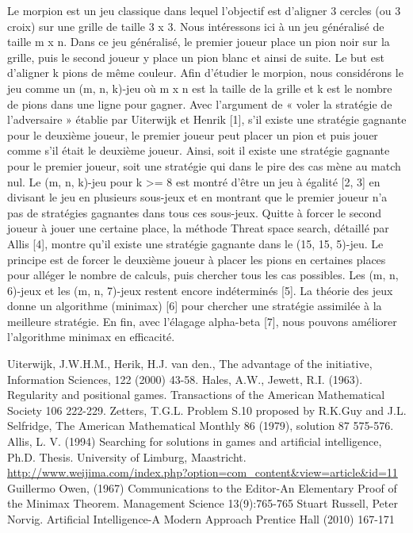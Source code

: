 Le morpion est un jeu classique dans lequel l'objectif est d'aligner 3 cercles (ou 3 croix) sur une grille de taille 3 x 3. Nous intéressons ici à un jeu généralisé de taille m x n. Dans ce jeu généralisé, le premier joueur place un pion noir sur la grille, puis le second joueur y place un pion blanc et ainsi de suite. Le but est d'aligner k pions de même couleur.
Afin d'étudier le morpion, nous considérons le jeu comme un (m, n, k)-jeu où m x n est la taille de la grille et k est le nombre de pions dans une ligne pour gagner. Avec l'argument de « voler la stratégie de l'adversaire » établie par Uiterwijk et Henrik [1], s'il existe une stratégie gagnante pour le deuxième joueur, le premier joueur peut placer un pion et puis jouer comme s'il était le deuxième joueur. Ainsi, soit il existe une stratégie gagnante pour le premier joueur, soit une stratégie qui dans le pire des cas mène au match nul. Le (m, n, k)-jeu pour k >= 8 est montré d'être un jeu à égalité [2, 3] en divisant le jeu en plusieurs sous-jeux et en montrant que le premier joueur n'a pas de stratégies gagnantes dans tous ces sous-jeux. Quitte à forcer le second joueur à jouer une certaine place, la méthode Threat space search, détaillé par Allis [4], montre qu'il existe une stratégie gagnante dans le (15, 15, 5)-jeu. Le principe est de forcer le deuxième joueur à placer les pions en certaines places pour alléger le nombre de calculs, puis chercher tous les cas possibles. Les (m, n, 6)-jeux et les (m, n, 7)-jeux restent encore indéterminés [5]. La théorie des jeux donne un algorithme (minimax) [6] pour chercher une stratégie assimilée à la meilleure stratégie. En fin, avec l'élagage alpha-beta [7], nous pouvons améliorer l'algorithme minimax en efficacité.

    Uiterwijk, J.W.H.M., Herik, H.J. van den., The advantage of the initiative, Information Sciences, 122 (2000) 43-58.
    Hales, A.W., Jewett, R.I. (1963). Regularity and positional games. Transactions of the American Mathematical Society 106 222-229.
    Zetters, T.G.L. Problem S.10 proposed by R.K.Guy and J.L. Selfridge, The American Mathematical Monthly 86 (1979), solution 87 575-576.
    Allis, L. V. (1994) Searching for solutions in games and artificial intelligence, Ph.D. Thesis. University of Limburg, Maastricht.
    \url{http://www.weijima.com/index.php?option=com_content&view=article&id=11}
    Guillermo Owen, (1967) Communications to the Editor-An Elementary Proof of the Minimax Theorem. Management Science 13(9):765-765
    Stuart Russell, Peter Norvig. Artificial Intelligence-A Modern Approach Prentice Hall (2010) 167-171
